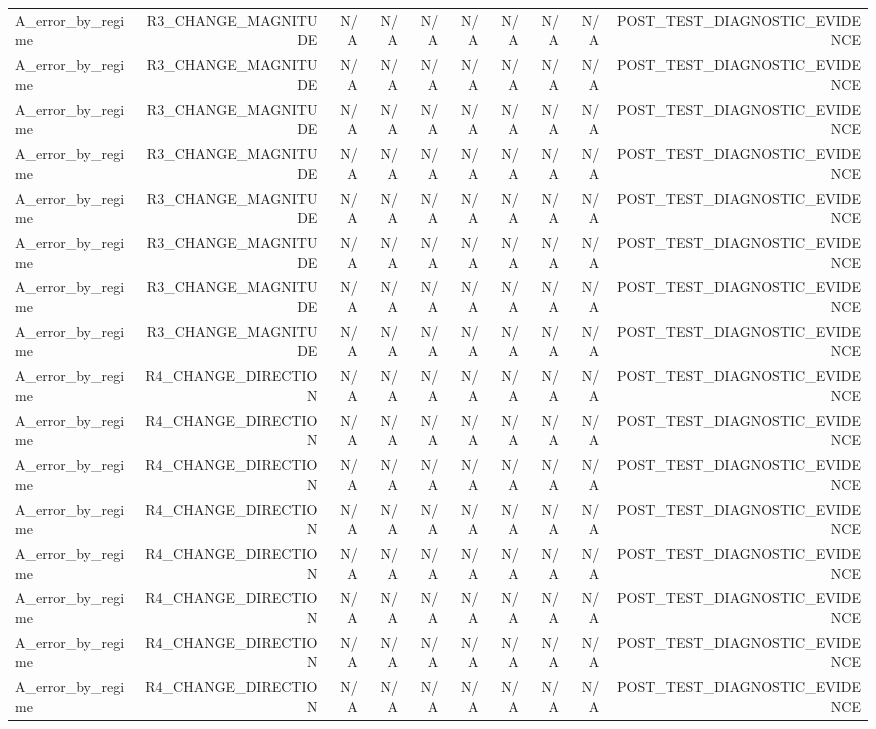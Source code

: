 \begin{table}[h!]
\begin{tabular}{lrrrrrrrrr}
A\_error\_by\_regime & R3\_CHANGE\_MAGNITUDE & N/A & N/A & N/A & N/A & N/A & N/A & N/A & POST\_TEST\_DIAGNOSTIC\_EVIDENCE \\
A\_error\_by\_regime & R3\_CHANGE\_MAGNITUDE & N/A & N/A & N/A & N/A & N/A & N/A & N/A & POST\_TEST\_DIAGNOSTIC\_EVIDENCE \\
A\_error\_by\_regime & R3\_CHANGE\_MAGNITUDE & N/A & N/A & N/A & N/A & N/A & N/A & N/A & POST\_TEST\_DIAGNOSTIC\_EVIDENCE \\
A\_error\_by\_regime & R3\_CHANGE\_MAGNITUDE & N/A & N/A & N/A & N/A & N/A & N/A & N/A & POST\_TEST\_DIAGNOSTIC\_EVIDENCE \\
A\_error\_by\_regime & R3\_CHANGE\_MAGNITUDE & N/A & N/A & N/A & N/A & N/A & N/A & N/A & POST\_TEST\_DIAGNOSTIC\_EVIDENCE \\
A\_error\_by\_regime & R3\_CHANGE\_MAGNITUDE & N/A & N/A & N/A & N/A & N/A & N/A & N/A & POST\_TEST\_DIAGNOSTIC\_EVIDENCE \\
A\_error\_by\_regime & R3\_CHANGE\_MAGNITUDE & N/A & N/A & N/A & N/A & N/A & N/A & N/A & POST\_TEST\_DIAGNOSTIC\_EVIDENCE \\
A\_error\_by\_regime & R3\_CHANGE\_MAGNITUDE & N/A & N/A & N/A & N/A & N/A & N/A & N/A & POST\_TEST\_DIAGNOSTIC\_EVIDENCE \\
A\_error\_by\_regime & R4\_CHANGE\_DIRECTION & N/A & N/A & N/A & N/A & N/A & N/A & N/A & POST\_TEST\_DIAGNOSTIC\_EVIDENCE \\
A\_error\_by\_regime & R4\_CHANGE\_DIRECTION & N/A & N/A & N/A & N/A & N/A & N/A & N/A & POST\_TEST\_DIAGNOSTIC\_EVIDENCE \\
A\_error\_by\_regime & R4\_CHANGE\_DIRECTION & N/A & N/A & N/A & N/A & N/A & N/A & N/A & POST\_TEST\_DIAGNOSTIC\_EVIDENCE \\
A\_error\_by\_regime & R4\_CHANGE\_DIRECTION & N/A & N/A & N/A & N/A & N/A & N/A & N/A & POST\_TEST\_DIAGNOSTIC\_EVIDENCE \\
A\_error\_by\_regime & R4\_CHANGE\_DIRECTION & N/A & N/A & N/A & N/A & N/A & N/A & N/A & POST\_TEST\_DIAGNOSTIC\_EVIDENCE \\
A\_error\_by\_regime & R4\_CHANGE\_DIRECTION & N/A & N/A & N/A & N/A & N/A & N/A & N/A & POST\_TEST\_DIAGNOSTIC\_EVIDENCE \\
A\_error\_by\_regime & R4\_CHANGE\_DIRECTION & N/A & N/A & N/A & N/A & N/A & N/A & N/A & POST\_TEST\_DIAGNOSTIC\_EVIDENCE \\
A\_error\_by\_regime & R4\_CHANGE\_DIRECTION & N/A & N/A & N/A & N/A & N/A & N/A & N/A & POST\_TEST\_DIAGNOSTIC\_EVIDENCE \\

\end{tabular}
\end{table}
